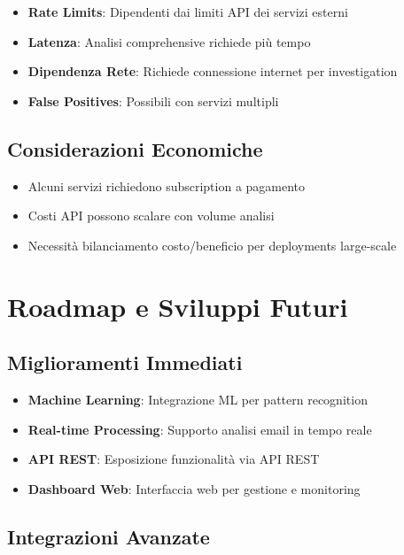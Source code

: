 \documentclass{article}
\begin{document}
\begin{itemize}
    \item \textbf{Rate Limits}: Dipendenti dai limiti API dei servizi esterni
    \item \textbf{Latenza}: Analisi comprehensive richiede più tempo
    \item \textbf{Dipendenza Rete}: Richiede connessione internet per investigation
    \item \textbf{False Positives}: Possibili con servizi multipli
\end{itemize}

\subsection{Considerazioni Economiche}

\begin{itemize}
    \item Alcuni servizi richiedono subscription a pagamento
    \item Costi API possono scalare con volume analisi
    \item Necessità bilanciamento costo/beneficio per deployments large-scale
\end{itemize}

\section{Roadmap e Sviluppi Futuri}

\subsection{Miglioramenti Immediati}

\begin{itemize}
    \item \textbf{Machine Learning}: Integrazione ML per pattern recognition
    \item \textbf{Real-time Processing}: Supporto analisi email in tempo reale
    \item \textbf{API REST}: Esposizione funzionalità via API REST
    \item \textbf{Dashboard Web}: Interfaccia web per gestione e monitoring
\end{itemize}

\subsection{Integrazioni Avanzate}
\end{document}

